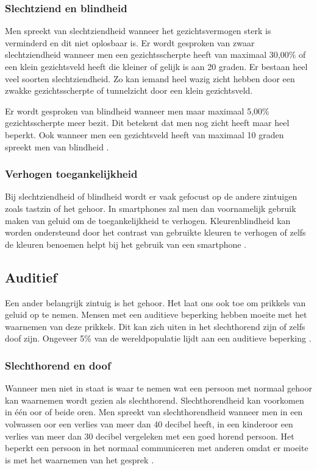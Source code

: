 \subsubsection{Slechtziend en blindheid}
Men spreekt van slechtziendheid wanneer het gezichtsvermogen sterk is verminderd en dit niet oplosbaar is. Er wordt gesproken van zwaar slechtziendheid wanneer men een gezichtsscherpte heeft van maximaal 30,00\% of een klein gezichtsveld heeft die kleiner of gelijk is aan 20 graden. Er bestaan heel veel soorten slechtziendheid. Zo kan iemand heel wazig zicht hebben door een zwakke gezichtsscherpte of tunnelzicht door een klein gezichtsveld.

 Er wordt gesproken van blindheid wanneer men maar maximaal 5,00\% gezichtsscherpte meer bezit. Dit betekent dat men nog zicht heeft maar heel beperkt. Ook wanneer men een gezichtsveld heeft van maximaal 10 graden spreekt men van blindheid \autocite{LiLi2019Blind}.




\subsubsection{Verhogen toegankelijkheid}
Bij slechtziendheid of blindheid wordt er vaak gefocust op de andere zintuigen zoals tastzin of het gehoor. In smartphones zal men dan voornamelijk gebruik maken van geluid om de toegankelijkheid te verhogen. Kleurenblindheid kan worden ondersteund door het contrast van gebruikte kleuren te verhogen of zelfs de kleuren benoemen helpt bij het gebruik van een smartphone \autocite{visioKleur2019}.


\subsection{Auditief}
\label{sec:Auditief}

Een ander belangrijk zintuig is het gehoor. Het laat ons ook toe om prikkels van geluid op te nemen. Mensen met een auditieve beperking hebben moeite met het waarnemen van deze prikkels. Dit kan zich uiten in het slechthorend zijn of zelfs doof zijn. Ongeveer 5\% van de wereldpopulatie lijdt aan een auditieve beperking \autocite{whoDAHL2019}.

\subsubsection{Slechthorend en doof}
Wanneer men niet in staat is waar te nemen wat een persoon met normaal gehoor kan waarnemen wordt gezien als slechthorend. Slechthorendheid kan voorkomen in één oor of beide oren. Men spreekt van slechthorendheid wanneer men in een volwassen oor een verlies van meer dan 40 decibel heeft, in een kinderoor een verlies van meer dan 30 decibel vergeleken met een goed horend persoon. Het beperkt een persoon in het normaal communiceren met anderen omdat er moeite is met het waarnemen van het gesprek \autocite{whoDAHL2019}.



